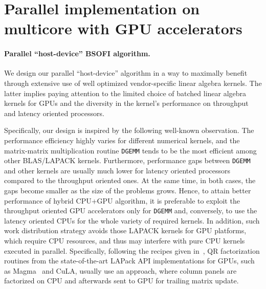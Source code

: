 \documentclass{llncs}
\newcommand{\Lapack}{{\sc LAPack}\xspace}
\newcommand{\Magma}{{\sc Magma}\xspace}
\newcommand{\Cula}{{\sc CuLA}\xspace}
\begin{document}
\section{Parallel implementation on multicore with GPU accelerators}
\label{sec:implementation_on_CPU+GPU}

\paragraph%
{Parallel ``host-device'' BSOFI algorithm.}\label{sec:alrorithms_for_accelerators}

We design our parallel ``host-device'' algorithm in a way to maximally benefit 
through extensive use of well optimized vendor-specific 
linear algebra kernels. %
The latter implies paying attention to 
the limited choice of batched linear algebra kernels for GPUs
and the diversity in the kernel's performance on throughput and latency oriented processors.

Specifically, our design is inspired by the following well-known 
observation. %
The performance efficiency
highly varies for different numerical kernels, 
and the matrix-matrix multiplication routine {\tt DGEMM}
tends to be the most efficient among other BLAS/LAPACK kernels. %
Furthermore, performance gaps between {\tt DGEMM} and other kernels
are usually much lower for 
latency oriented processors compared to the throughput oriented ones.
At the same time, in both cases, the gaps become smaller 
as the size of the problems grows.
Hence, 
to attain better performance of hybrid CPU+GPU algorithm, 
it is preferable to exploit 
the throughput oriented GPU accelerators only for {\tt DGEMM}
and, conversely, 
to use the latency oriented CPUs for the whole variety of required kernels.
In addition, such work distribution strategy
avoids those LAPACK kernels for GPU platforms,
which require CPU resources, 
and thus may 
interfere with pure CPU kernels
executed in parallel.
Specifically, %
following the recipes given in~\cite{Volkov08LU_QR_Cholesky},
QR factorization routines 
from the state-of-the-art \Lapack API implementations for GPUs,
such as \Magma~\cite{Tomov10Magma} and
\Cula,
usually use an approach, 
where column panels are factorized on CPU 
and afterwards sent to GPU for trailing matrix update.%
\end{document}
